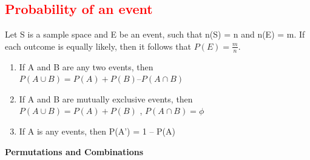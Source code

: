 \documentclass{article}
\begin{document}
\begin{multicols}{2}
\subsection*{\large \textcolor{red}{Probability of an event}}
Let S is a sample space and E be an event, such that n(S) = n and n(E) = m. If each outcome is equally likely, then it follows that $P(E) = \frac{m}{n}$.

\begin{enumerate}
    \item If A and B are any two events, then $P(A \cup B) = P(A) + P(B) – P(A \cap B)$
    \item If A and B are mutually exclusive events, then $P(A \cup B) = P(A) + P(B)$ , $P(A \cap B)=\phi$
    \item If A is any events, then P(A$’$) = 1 – P(A)
\end{enumerate}

\end{multicols}
\pagebreak

\begin{center}
    {\LARGE \textbf{Permutations and Combinations} }
\end{center}
\end{document}

